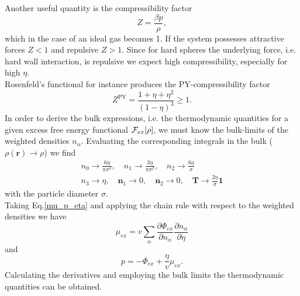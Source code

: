 \documentclass{article}
\begin{document}
Another useful quantity is the compressibility factor
\begin{equation}
	Z = \frac{\beta p}{\rho},
\end{equation}
which in the case of an ideal gas becomes 1. If the system possesses attractive forces $Z<1$ and repulsive $Z>1$. Since for hard spheres the underlying force, i.e. hard wall interaction, is repulsive we expect high compressibility, especially for high $\eta$.\\
Rosenfeld's functional for instance produces the PY-compressibility factor
\begin{equation}
	Z^{\text{PY}} = \frac{1+\eta+\eta^2}{(1-\eta)^3}\geq 1.
\end{equation}
In order to derive the bulk expressions, i.e. the thermodynamic quantities for a given excess free energy functional ${\cal F}_{ex}[\rho]$, we must know the bulk-limits of the weighted densities $n_\alpha$. Evaluating the corresponding integrals in the bulk ($\rho(\mathbf{r})\rightarrow\rho$) we find
\begin{gather}
	n_0\rightarrow\frac{6\eta}{\pi\sigma^3}, \quad n_1\rightarrow \frac{3\eta}{\pi\sigma^2},\quad n_2\rightarrow \frac{6\eta}{\sigma}\\\nonumber
	n_3\rightarrow\eta,\quad \mathbf{n}_1\rightarrow 0,\quad \mathbf{n}_2\rightarrow 0,\quad \mathbf{T}\rightarrow \frac{2\eta}{\sigma}\mathbf{1}
\end{gather}
with the particle diameter $\sigma$.\\
Taking Eq.\eqref{mu_p_eta} and applying the chain rule with respect to the weighted densities we have
\begin{equation}
	\mu_{ex} = v \sum_\alpha \frac{\partial\Phi_{ex}}{\partial n_\alpha}\frac{\partial n_\alpha}{\partial \eta}
\end{equation}
and
\begin{equation}
	p = -\Phi_{ex} + \frac{\eta}{v}\mu_{ex}.
\end{equation}
Calculating the derivatives and employing the bulk limits the thermodynamic quantities can be obtained.
\end{document}
